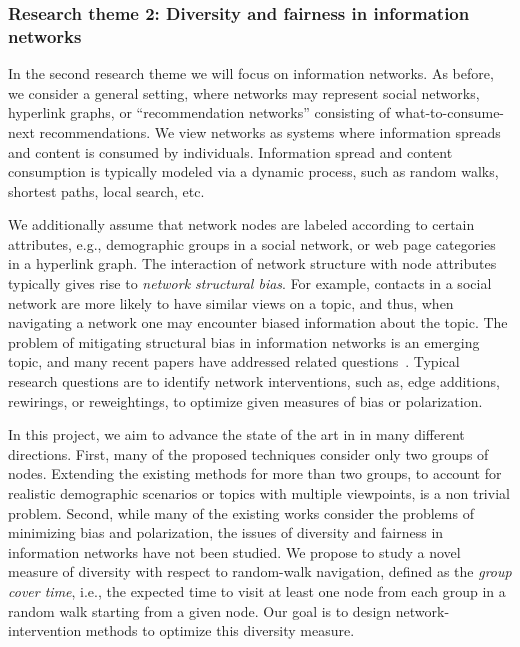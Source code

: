 \documentclass[a4paper,11pt]{article}
\begin{document}
\vspace{-1mm}
\subsubsection*{Research theme 2: Diversity and fairness in information networks}
\vspace{-1mm}

In the second research theme we will focus on information networks. 
As before, we consider a general setting, 
where networks may represent
social networks, 
hyperlink graphs, or 
``recommendation networks'' consisting of what-to-consume-next recommendations.
We view networks as systems where information spreads and content is consumed by individuals. 
Information spread and content consumption
is typically modeled via a dynamic process, such as random walks, 
shortest paths, local search, etc.

We additionally assume that network nodes are labeled according to certain attributes, 
e.g., demographic groups in a social network, or 
web page categories in a hyperlink graph. 
The interaction of network structure with node attributes typically gives rise to 
\emph{network structural bias}.
For example, contacts in a social network are more likely to have similar views on a topic, 
and thus, when navigating a network one may encounter biased information about the topic.
The problem of mitigating structural bias in information networks is an emerging topic, 
and many recent papers have addressed related questions~\cite{adriaens2022diameter,adriaens2023minimizing,cinus2023rebalancing,coupette2023reducing,fabbri2022rewiring,haddadan2022reducing}.
Typical research questions are to identify network interventions, 
such as, edge additions, re\-wirings, or re\-weightings, 
to optimize given measures of bias or polarization.

In this project, we aim to advance the state of the art in in many different directions. 
First, many of the proposed techniques consider only two groups of nodes.
Extending the existing methods for more than two groups, 
to account for realistic demographic scenarios or topics with multiple viewpoints, 
is a non trivial problem.
Second, while many of the existing works consider the problems of minimizing bias and polarization, 
the issues of diversity and fairness in information networks have not been studied.  
We propose to study a novel measure of diversity with respect to random-walk navigation, 
defined as the \emph{group cover time}, i.e., 
the expected time to visit at least one node from each group
in a random walk starting from a given node.
Our goal is to design network-intervention methods to 
optimize this diversity measure.
\end{document}
